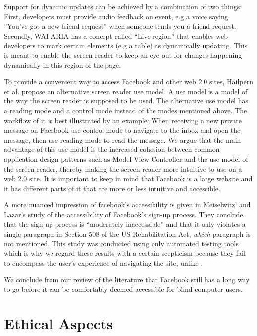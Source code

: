 \documentclass[conference]{IEEEtran}
\begin{document}
Support for dynamic updates can be achieved by a combination of two things\cite{hailpern2009}: First, developers must provide audio feedback on event, e.g a voice saying ''You've got a new friend request'' when someone sends you a friend request. Secondly, WAI-ARIA has a concept called ``Live region''\cite{ariaspec} that enables web developers to mark certain elements (e.g a table) as dynamically updating. This is meant to enable the screen reader to keep an eye out for changes happening dynamically in this region of the page.

To provide a convenient way to access Facebook and other web 2.0 sites, Hailpern et al\cite{hailpern2009}. propose an alternative screen reader use model. A use model is a model of the way the screen reader is supposed to be used. The alternative use model has a reading mode and a control mode instead of the modes mentioned above. The workflow of it is best illustrated by an example: When receiving a new private message on Facebook use control mode to navigate to the inbox and open the message, then use reading mode to read the message. We argue that the main advantage of this use model is the increased cohesion between common application design patterns such as Model-View-Controller and the use model of the screen reader, thereby making the screen reader more intuitive to use on a web 2.0 site. It is important to keep in mind that Facebook is a large website and it has different parts of it that are more or less intuitive and accessible.

A more nuanced impression of facebook's accessibility is given in Meiselwitz' and Lazar's \cite{meiselwitz2009} study of the accessibility of Facebook's sign-up process. They conclude that the sign-up process is ``moderately inaccessible'' and that it only violates a single paragraph in Section 508 of the US Rehabilitation Act, \emph{which} paragraph is not mentioned. This study was conducted using only automated testing tools which is why we regard these results with a certain scepticism because they fail to encompass the user's experience of navigating the site, unlike \cite{buzzi2010}.

We conclude from our review of the literature that Facebook still has a long way to go before it can be comfortably deemed accessible for blind computer users. 

\section{Ethical Aspects}
\label{ethics} 
\end{document}
